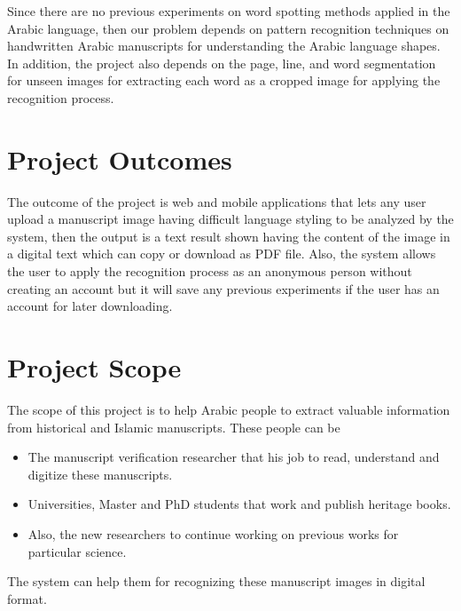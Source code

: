 \noindent
Since there are no previous experiments on word spotting methods applied in the Arabic language, then our problem depends on pattern recognition techniques on handwritten Arabic manuscripts for understanding the Arabic language shapes. In addition, the project also depends on the page, line, and word segmentation for unseen images for extracting each word as a cropped image for applying the recognition process.

\section{Project Outcomes}
The outcome of the project is web and mobile applications that lets any user upload a manuscript image having difficult language styling to be analyzed by the system, then the output is a text result shown having the content of the image in a digital text which can copy or download as PDF file. Also, the system allows the user to apply the recognition process as an anonymous person without creating an account but it will save any previous experiments if the user has an account for later downloading.

\section{Project Scope}
The scope of this project is to help Arabic people to extract valuable information from historical and Islamic manuscripts. These people can be

\begin{itemize}[itemsep=1pt, topsep=5pt]
    \item The manuscript verification researcher that his job to read, understand and digitize these manuscripts.
    \item Universities, Master and PhD students that work and publish heritage books.
    \item Also, the new researchers to continue working on previous works for particular science.
\end{itemize}

The system can help them for recognizing these manuscript images in digital format.

